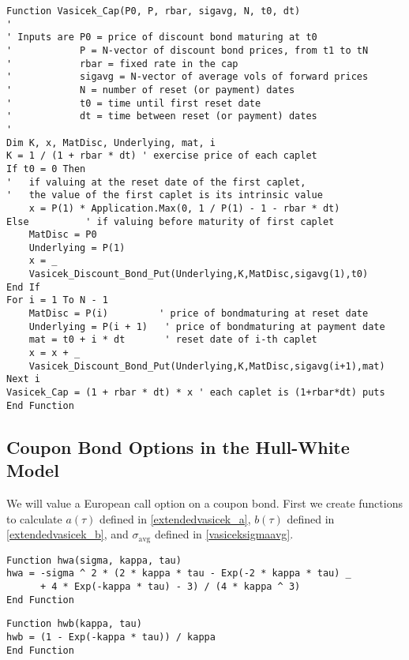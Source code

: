 \small\begin{verbatim}
Function Vasicek_Cap(P0, P, rbar, sigavg, N, t0, dt)
'
' Inputs are P0 = price of discount bond maturing at t0
'            P = N-vector of discount bond prices, from t1 to tN
'            rbar = fixed rate in the cap
'            sigavg = N-vector of average vols of forward prices
'            N = number of reset (or payment) dates
'            t0 = time until first reset date
'            dt = time between reset (or payment) dates
'
Dim K, x, MatDisc, Underlying, mat, i
K = 1 / (1 + rbar * dt) ' exercise price of each caplet
If t0 = 0 Then
'   if valuing at the reset date of the first caplet,
'   the value of the first caplet is its intrinsic value
    x = P(1) * Application.Max(0, 1 / P(1) - 1 - rbar * dt)
Else          ' if valuing before maturity of first caplet
    MatDisc = P0
    Underlying = P(1)
    x = _
    Vasicek_Discount_Bond_Put(Underlying,K,MatDisc,sigavg(1),t0)
End If
For i = 1 To N - 1
    MatDisc = P(i)         ' price of bondmaturing at reset date
    Underlying = P(i + 1)   ' price of bondmaturing at payment date
    mat = t0 + i * dt       ' reset date of i-th caplet
    x = x + _
    Vasicek_Discount_Bond_Put(Underlying,K,MatDisc,sigavg(i+1),mat)
Next i
Vasicek_Cap = (1 + rbar * dt) * x ' each caplet is (1+rbar*dt) puts
End Function
\end{verbatim}\normalsize

\subsection*{Coupon Bond Options in the Hull-White Model}

We will value a European call option on a coupon bond.  First we create functions to calculate $a(\tau)$ defined in \eqref{extendedvasicek_a}, $b(\tau)$ defined in \eqref{extendedvasicek_b}, and $\sigma_{\text{avg}}$ defined in \eqref{vasiceksigmaavg}.

\small\begin{verbatim}
Function hwa(sigma, kappa, tau)
hwa = -sigma ^ 2 * (2 * kappa * tau - Exp(-2 * kappa * tau) _
      + 4 * Exp(-kappa * tau) - 3) / (4 * kappa ^ 3)
End Function
\end{verbatim}\normalsize

\small\begin{verbatim}
Function hwb(kappa, tau)
hwb = (1 - Exp(-kappa * tau)) / kappa
End Function
\end{verbatim}\normalsize

